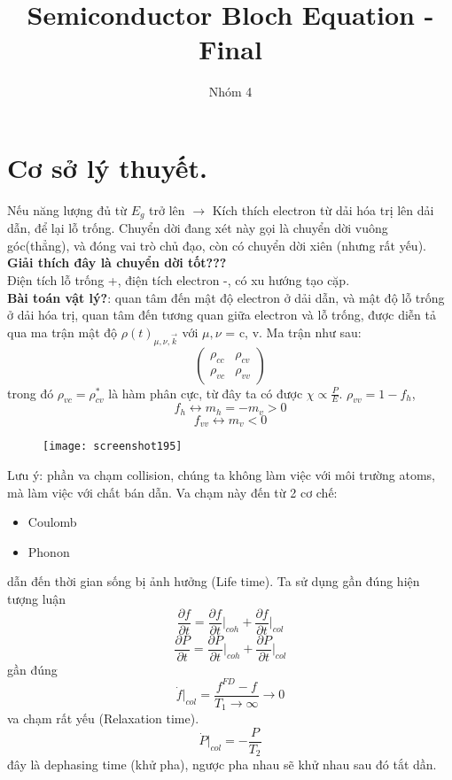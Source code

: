 \documentclass[16Pt]{article}
\title{\Huge{Semiconductor Bloch Equation - Final}}
\begin{document}
	\author{Nhóm 4}
	
	\maketitle
	
	\section{Cơ sở lý thuyết.}
	Nếu năng lượng đủ từ $E_g$ trở lên $\rightarrow$ Kích thích electron từ dải hóa trị lên dải dẫn, để lại lỗ trống. Chuyển dời đang xét này gọi là chuyển dời vuông góc(thẳng), và đóng vai trò chủ đạo, còn có chuyển dời xiên (nhưng rất yếu). \textbf{Giải thích đây là chuyển dời tốt???}\\
	
	Điện tích lỗ trống +, điện tích electron -, có xu hướng tạo cặp.\\
	
	\textbf{Bài toán vật lý?}: quan tâm đến mật độ electron ở dải dẫn, và mật độ lỗ trống ở dải hóa trị, quan tâm đến tương quan giữa electron và lỗ trống, được diễn tả qua ma trận mật độ $\rho(t)_{\mu,\nu, \vec{k}}$ với $\mu, \nu$ = c, v. Ma trận như sau:\\
	\[
	\begin{pmatrix}
		\rho_{cc} & \rho_{cv} \\
		\rho_{vc} & \rho_{vv}
	\end{pmatrix}
	\]
	trong đó $\rho_{vc} = \rho_{cv}^*$ là hàm phân cực, từ đây ta có được $\chi \propto \frac{P}{E} $. $\rho_{vv} = 1 - f_h$, 
	\[
	f_h \leftrightarrow	m_h = - m_v > 0
	\] 
	\[
	f_{vv} \leftrightarrow m_v < 0
	\]
	
	\begin{figure}[h!]
		\centering
		\texttt{[image: screenshot195]}
	\end{figure}
	
	Lưu ý: phần va chạm collision, chúng ta không làm việc với môi trường atoms, mà làm việc với chất bán dẫn. Va chạm này đến từ 2 cơ chế:
	\begin{itemize}
		\item Coulomb
		\item Phonon
	\end{itemize}
	dẫn đến thời gian sống bị ảnh hưởng (Life time). Ta sử dụng gần đúng hiện tượng luận 
	\[
	\frac{\partial f}{\partial t} = \frac{\partial f}{\partial t} \Bigg|_{coh} +\frac{\partial f}{\partial t} \Bigg|_{col} 
	\]
	\[
	\frac{\partial P}{\partial t} = \frac{\partial P}{\partial t} \Bigg|_{coh} + \frac{\partial P}{\partial t} \Bigg|_{col} 
	\]
	gần đúng 
	\[
	\dot{f}\Bigg|_{col} = \frac{f^{FD} - f}{T_1 \rightarrow \infty} \rightarrow 0
	\]
	va chạm rất yếu (Relaxation time).
	\[
	\dot{P}\Bigg|_{col} = - \frac{P}{T_2}
	\]
	đây là dephasing time (khử pha), ngược pha nhau sẽ khử nhau sau đó tắt dần.\\
	 
\end{document}
